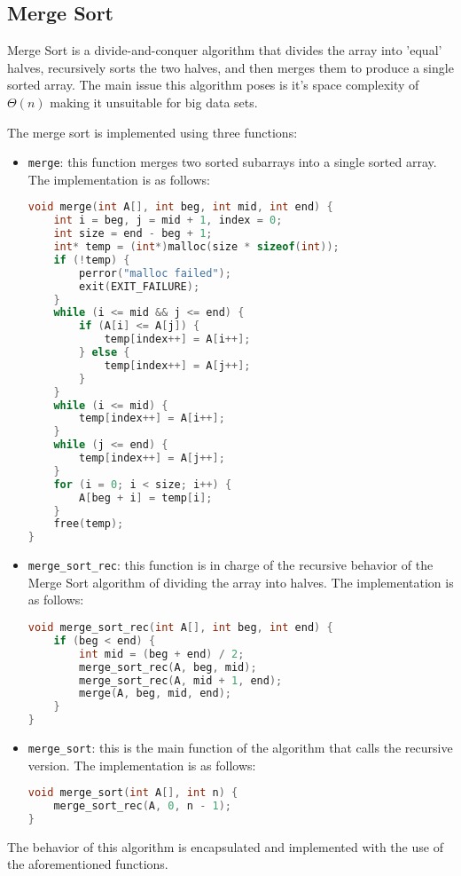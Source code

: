 \documentclass[conference]{IEEEtran}
\begin{document}
\subsection{Merge Sort}
Merge Sort is a divide-and-conquer algorithm that divides the array into 'equal' halves, recursively sorts the two halves, and then merges them to produce a single sorted array. The main issue this algorithm poses is it's space complexity of $\Theta(n)$ making it unsuitable for big data sets. 

The merge sort is implemented using three functions:
\begin{itemize}
    \item \texttt{merge}: this function merges two sorted subarrays into a single sorted array. The implementation is as follows:
    \begin{lstlisting}[language=C]
void merge(int A[], int beg, int mid, int end) {
    int i = beg, j = mid + 1, index = 0;
    int size = end - beg + 1;
    int* temp = (int*)malloc(size * sizeof(int));
    if (!temp) {
        perror("malloc failed");
        exit(EXIT_FAILURE);
    }
    while (i <= mid && j <= end) {
        if (A[i] <= A[j]) {
            temp[index++] = A[i++];
        } else {
            temp[index++] = A[j++];
        }
    }
    while (i <= mid) {
        temp[index++] = A[i++];
    }
    while (j <= end) {
        temp[index++] = A[j++];
    }
    for (i = 0; i < size; i++) {
        A[beg + i] = temp[i];
    }
    free(temp); 
}
    \end{lstlisting}
    \item \texttt{merge\_sort\_rec}: this function is in charge of the recursive behavior of the Merge Sort algorithm of dividing the array into halves. The implementation is as follows:
    \begin{lstlisting}[language=C]
void merge_sort_rec(int A[], int beg, int end) {
    if (beg < end) {
        int mid = (beg + end) / 2;
        merge_sort_rec(A, beg, mid);
        merge_sort_rec(A, mid + 1, end);
        merge(A, beg, mid, end);
    }
}
    \end{lstlisting}
    \item \texttt{merge\_sort}: this is the main function of the algorithm that calls the recursive version. The implementation is as follows:
    \begin{lstlisting}[language=C]
void merge_sort(int A[], int n) {
    merge_sort_rec(A, 0, n - 1);
}
    \end{lstlisting}
\end{itemize}
The behavior of this algorithm is encapsulated and implemented with the use of the aforementioned functions. 
\end{document}
